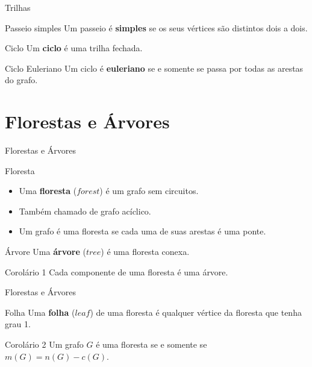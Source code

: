 \documentclass[xcolor=dvipsnames,table]{beamer}
\begin{document}
	\begin{frame}{Trilhas}
		\begin{block}{Passeio simples}
			Um passeio é {\bf simples} se os seus vértices são distintos dois a dois.
		\end{block}
		\begin{block}{Ciclo}
			Um {\bf ciclo} é uma trilha fechada.
		\end{block}
		\begin{block}{Ciclo Euleriano}
			Um ciclo é {\bf euleriano} se e somente se passa por todas as arestas do grafo.
		\end{block}
	\end{frame}
	
	\section{Florestas e Árvores}
	\begin{frame}{Florestas e Árvores}
		\begin{block}{Floresta}
			\begin{itemize}
				\item Uma {\bf floresta} ($forest$) é um grafo sem circuitos. \pause
				\item Também chamado de grafo acíclico. \pause
				\item Um grafo é uma floresta se cada uma de suas arestas é uma ponte. 
			\end{itemize}
		\end{block} \pause
		\begin{block}{Árvore}
			Uma {\bf árvore} ($tree$) é uma floresta conexa. 
		\end{block} \pause
		\begin{block}{Corolário 1}
			Cada componente de uma floresta é uma árvore.
		\end{block}
	\end{frame}
	
	\begin{frame}{Florestas e Árvores}
		\begin{block}{Folha}
			Uma {\bf folha} ($leaf$) de uma floresta é qualquer vértice da floresta que tenha grau 1.
		\end{block} \pause
		\begin{block}{Corolário 2}
			Um grafo $G$ é uma floresta se e somente se $m(G) = n(G) - c(G)$.
		\end{block}
	\end{frame}
	
\end{document}
